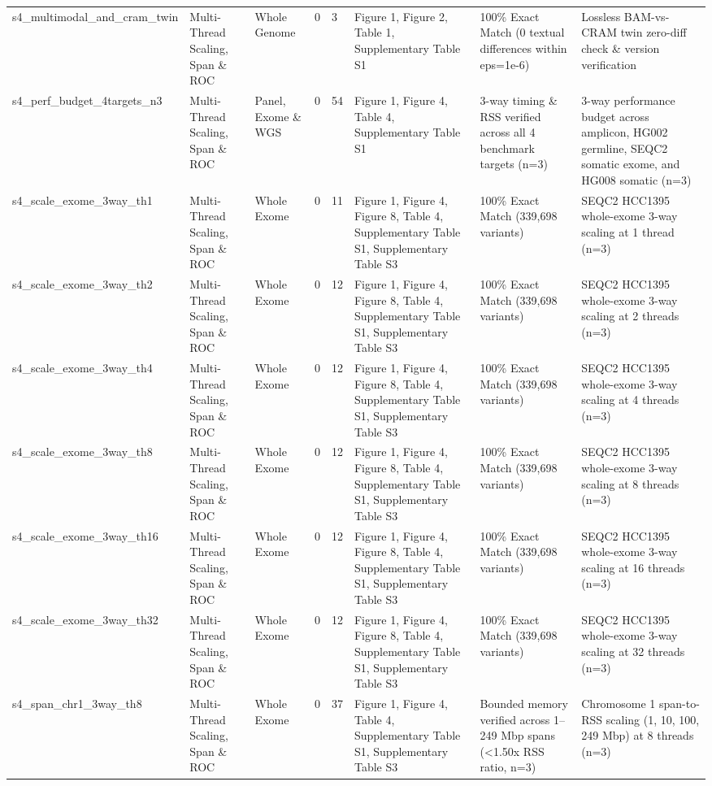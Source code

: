 \begin{table}[htbp]
{\begin{tabular}{llllllll}
s4\_multimodal\_and\_cram\_twin & Multi-Thread Scaling, Span \& ROC & Whole Genome & 0 & 3 & Figure 1, Figure 2, Table 1, Supplementary Table S1 & 100\% Exact Match (0 textual differences within eps=1e-6) & Lossless BAM-vs-CRAM twin zero-diff check \& version verification \\
s4\_perf\_budget\_4targets\_n3 & Multi-Thread Scaling, Span \& ROC & Panel, Exome \& WGS & 0 & 54 & Figure 1, Figure 4, Table 4, Supplementary Table S1 & 3-way timing \& RSS verified across all 4 benchmark targets (n=3) & 3-way performance budget across amplicon, HG002 germline, SEQC2 somatic exome, and HG008 somatic (n=3) \\
s4\_scale\_exome\_3way\_th1 & Multi-Thread Scaling, Span \& ROC & Whole Exome & 0 & 11 & Figure 1, Figure 4, Figure 8, Table 4, Supplementary Table S1, Supplementary Table S3 & 100\% Exact Match (339,698 variants) & SEQC2 HCC1395 whole-exome 3-way scaling at 1 thread (n=3) \\
s4\_scale\_exome\_3way\_th2 & Multi-Thread Scaling, Span \& ROC & Whole Exome & 0 & 12 & Figure 1, Figure 4, Figure 8, Table 4, Supplementary Table S1, Supplementary Table S3 & 100\% Exact Match (339,698 variants) & SEQC2 HCC1395 whole-exome 3-way scaling at 2 threads (n=3) \\
s4\_scale\_exome\_3way\_th4 & Multi-Thread Scaling, Span \& ROC & Whole Exome & 0 & 12 & Figure 1, Figure 4, Figure 8, Table 4, Supplementary Table S1, Supplementary Table S3 & 100\% Exact Match (339,698 variants) & SEQC2 HCC1395 whole-exome 3-way scaling at 4 threads (n=3) \\
s4\_scale\_exome\_3way\_th8 & Multi-Thread Scaling, Span \& ROC & Whole Exome & 0 & 12 & Figure 1, Figure 4, Figure 8, Table 4, Supplementary Table S1, Supplementary Table S3 & 100\% Exact Match (339,698 variants) & SEQC2 HCC1395 whole-exome 3-way scaling at 8 threads (n=3) \\
s4\_scale\_exome\_3way\_th16 & Multi-Thread Scaling, Span \& ROC & Whole Exome & 0 & 12 & Figure 1, Figure 4, Figure 8, Table 4, Supplementary Table S1, Supplementary Table S3 & 100\% Exact Match (339,698 variants) & SEQC2 HCC1395 whole-exome 3-way scaling at 16 threads (n=3) \\
s4\_scale\_exome\_3way\_th32 & Multi-Thread Scaling, Span \& ROC & Whole Exome & 0 & 12 & Figure 1, Figure 4, Figure 8, Table 4, Supplementary Table S1, Supplementary Table S3 & 100\% Exact Match (339,698 variants) & SEQC2 HCC1395 whole-exome 3-way scaling at 32 threads (n=3) \\
s4\_span\_chr1\_3way\_th8 & Multi-Thread Scaling, Span \& ROC & Whole Exome & 0 & 37 & Figure 1, Figure 4, Table 4, Supplementary Table S1, Supplementary Table S3 & Bounded memory verified across 1--249 Mbp spans (\textless{}1.50x RSS ratio, n=3) & Chromosome 1 span-to-RSS scaling (1, 10, 100, 249 Mbp) at 8 threads (n=3) \\

\end{tabular}}
\end{table}
